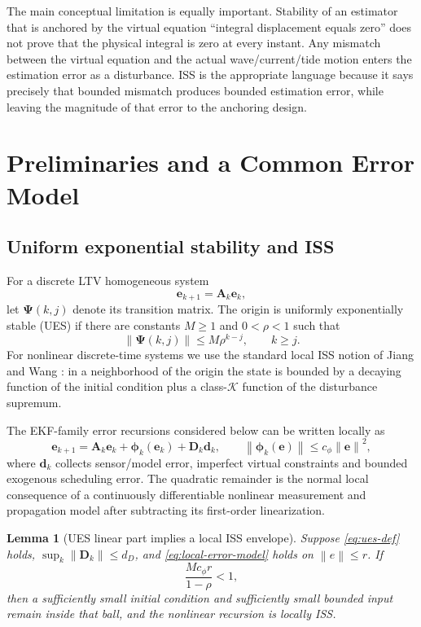 \documentclass[conference]{IEEEtran}
\DeclareRobustCommand{\vct}[1]{\bm{#1}}
\DeclareRobustCommand{\mat}[1]{\bm{#1}}
\newcommand{\norm}[1]{\left\lVert#1\right\rVert}
\newtheorem{lemma}{Lemma}
\theoremstyle{remark}
\begin{document}
The main conceptual limitation is equally important.  Stability of an estimator
that is anchored by the virtual equation ``integral displacement equals zero''
does not prove that the physical integral is zero at every instant.  Any
mismatch between the virtual equation and the actual wave/current/tide motion
enters the estimation error as a disturbance.  ISS is the appropriate language
because it says precisely that bounded mismatch produces bounded estimation
error, while leaving the magnitude of that error to the anchoring design.

\section{Preliminaries and a Common Error Model}

\subsection{Uniform exponential stability and ISS}
For a discrete LTV homogeneous system
\begin{equation}
  \vct e_{k+1}=\mat A_k\vct e_k,
\end{equation}
let $\mat\Psi(k,j)$ denote its transition matrix.  The origin is uniformly
exponentially stable (UES) if there are constants $M\ge1$ and $0<\rho<1$ such
that
\begin{equation}
  \norm{\mat\Psi(k,j)}\le M\rho^{k-j},\qquad k\ge j.
  \label{eq:ues-def}
\end{equation}
For nonlinear discrete-time systems we use the standard local ISS notion of
Jiang and Wang \cite{JiangWang2001_DiscreteISS}: in a neighborhood of the
origin the state is bounded by a decaying function of the initial condition
plus a class-$\mathcal K$ function of the disturbance supremum.

The EKF-family error recursions considered below can be written locally as
\begin{equation}
 \vct e_{k+1}
 =\mat A_k\vct e_k+\vct\phi_k(\vct e_k)+\mat D_k\vct d_k,
 \qquad
 \norm{\vct\phi_k(\vct e)}\le c_\phi\norm{\vct e}^2,
 \label{eq:local-error-model}
\end{equation}
where $\vct d_k$ collects sensor/model error, imperfect virtual constraints and
bounded exogenous scheduling error.  The quadratic remainder is the normal
local consequence of a continuously differentiable nonlinear measurement and
propagation model after subtracting its first-order linearization.

\begin{lemma}[UES linear part implies a local ISS envelope]
\label{lem:ues-local-iss}
Suppose \eqref{eq:ues-def} holds, $\sup_k\norm{\mat D_k}\le d_D$, and
\eqref{eq:local-error-model} holds on $\norm e\le r$.  If
\begin{equation}
  \frac{M c_\phi r}{1-\rho}<1,
  \label{eq:small-gain-radius}
\end{equation}
then a sufficiently small initial condition and sufficiently small bounded input
remain inside that ball, and the nonlinear recursion is locally ISS.
\end{lemma}
\end{document}
